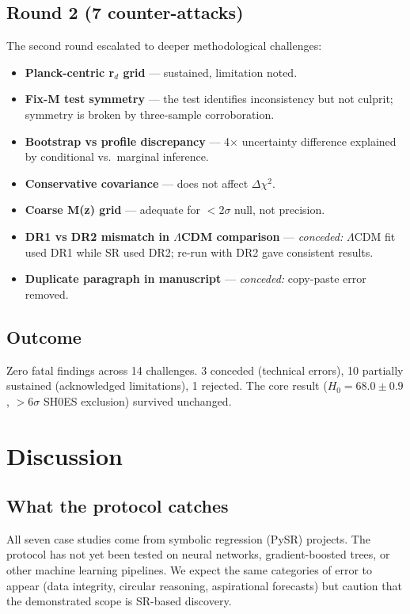 \documentclass[twocolumn]{aastex631}
\begin{document}
\subsection*{Round 2 (7 counter-attacks)}
The second round escalated to deeper methodological challenges:
\begin{itemize}
  \item \textbf{Planck-centric r$_d$ grid} --- sustained, limitation noted.
  \item \textbf{Fix-M test symmetry} --- the test identifies inconsistency
        but not culprit; symmetry is broken by three-sample corroboration.
  \item \textbf{Bootstrap vs profile discrepancy} --- 4$\times$
        uncertainty difference explained by conditional vs.\ marginal
        inference.
  \item \textbf{Conservative covariance} --- does not affect $\Delta\chi^2$.
  \item \textbf{Coarse M(z) grid} --- adequate for $<2\sigma$ null,
        not precision.
  \item \textbf{DR1 vs DR2 mismatch in $\Lambda$CDM comparison} ---
        \emph{conceded:} $\Lambda$CDM fit used DR1 while SR used DR2;
        re-run with DR2 gave consistent results.
  \item \textbf{Duplicate paragraph in manuscript} --- \emph{conceded:}
        copy-paste error removed.
\end{itemize}

\subsection*{Outcome}
Zero fatal findings across 14 challenges.  3 conceded (technical errors),
10 partially sustained (acknowledged limitations), 1 rejected.
The core result ($H_0=68.0\pm0.9$, $>6\sigma$ SH0ES exclusion)
survived unchanged.

\section{Discussion}

\subsection{What the protocol catches}

All seven case studies come from symbolic regression (PySR) projects.
The protocol has not yet been tested on neural networks, gradient-boosted
trees, or other machine learning pipelines.  We expect the same categories
of error to appear (data integrity, circular reasoning, aspirational
forecasts) but caution that the demonstrated scope is SR-based discovery.
\end{document}
